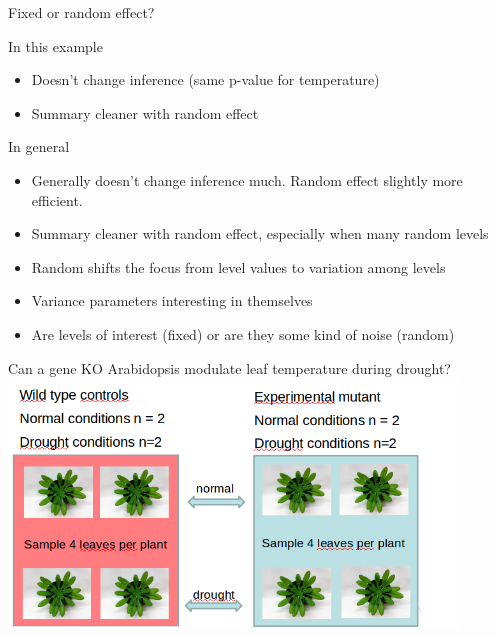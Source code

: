 \documentclass[10pt]{beamer}
\begin{document}
\begin{frame}{Fixed or random effect?}
  \begin{block}{In this example}
   \begin{itemize}
    \item Doesn't change inference (same p-value for temperature)
    \item Summary cleaner with random effect
   \end{itemize}
  \end{block}

  \pause
  
  \begin{block}{In general}
   \begin{itemize}
    \item Generally doesn't change inference much. Random effect slightly more efficient.
    \item Summary cleaner with random effect, especially when many random levels
    \item Random shifts the focus from level values to variation among levels
    \item Variance parameters interesting in themselves
    \item Are levels of interest (fixed) or are they some kind of noise (random)
   \end{itemize}
  \end{block}

\end{frame}


\begin{frame}{Can a gene KO Arabidopsis modulate leaf temperature during drought?}
 \centering
 \includegraphics[width=0.9\textwidth]{Figures/koara}
\end{frame}
\end{document}
